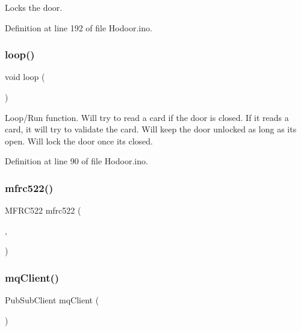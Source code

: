 Locks the door. 



Definition at line 192 of file Hodoor.\+ino.

\mbox{\label{_hodoor_8ino_afe461d27b9c48d5921c00d521181f12f}} 
\subsubsection{\texorpdfstring{loop()}{loop()}}
{\footnotesize\ttfamily void loop (\begin{DoxyParamCaption}{ }\end{DoxyParamCaption})}

Loop/\+Run function. Will try to read a card if the door is closed. If it reads a card, it will try to validate the card. Will keep the door unlocked as long as it\textquotesingle{}s open. Will lock the door once its closed. 

Definition at line 90 of file Hodoor.\+ino.

\mbox{\label{_hodoor_8ino_ac672f817299d07cc428fe3f456235273}} 
\subsubsection{\texorpdfstring{mfrc522()}{mfrc522()}}
{\footnotesize\ttfamily M\+F\+R\+C522 mfrc522 (\begin{DoxyParamCaption}\item[{\mbox{\hyperlink{_hodoor_8ino_a86fac98c9b4c98a3e50fc45440878391}{S\+S\+\_\+\+P\+IN}}}]{,  }\item[{\mbox{\hyperlink{_hodoor_8ino_a36932b0e869e0114f32e255f61306d6b}{R\+S\+T\+\_\+\+P\+IN}}}]{ }\end{DoxyParamCaption})}

\mbox{\label{_hodoor_8ino_a3723ecd4627fe1acd7f94dd266f1105a}} 
\subsubsection{\texorpdfstring{mq\+Client()}{mqClient()}}
{\footnotesize\ttfamily Pub\+Sub\+Client mq\+Client (\begin{DoxyParamCaption}\item[{\mbox{\hyperlink{_snap_box_8ino_abd77e757e4b3bb6f1e4b42b21ea9e040}{esp\+Client}}}]{ }\end{DoxyParamCaption})}

